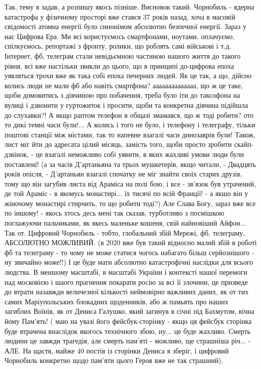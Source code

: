 Так, тему я задав, а розпишу якось пізніше. Висновок такий.  Чорнобиль - ядерна
катастрофа у фізичному просторі вже стався 37 років назад, хоча в масовій
свідомості атомна енергії було синонімом абсолютно безпечної енергії. Зараз у
нас Цифрова Ера. Ми всі користуємось смартфонами, ноутами, оплачуємо,
спілкуємось, репортажі з фронту, ролики, що роблять самі військові і т.д.
Інтернет, фб, телеграм стали невідьємною частиною нашого життя до такого рівня,
всі вже настільки звикли до цього, що в принципі до-цифрова епоха уявляться
трохи вже як така собі епоха печерних людей. Як це так, а що, дійсно колись
люди не мали фб або навіть смартфона? аааааааааааааа, що ж це таке, щоби
домовитись з дівчиною про побачення, треба було іти до таксофона на вулиці і
дзвонити у гуртожиток і просити, щоби та конкретна дівчина підійшла до
слухавки?!  А якщо раптом телефон в общазі змамався, що ж тоді робити?  ото то
дикі темні часи були!... А колись і того не було, і телефону і телеграфу,
тільки поштові станції між містами, так то напевне взагалі часи динозаврів
були! Також, лист міг йти до адресата цілий місяць, замість того, щоби просто
зробити скайп-дзвінок, - це взагалі неможливо собі уявити, в яких жахливі умови
люди були поставлені! (а за часів Д'артаньяна та трьох мушкетерів, якщо читали,
- Двадцять років опісля, - Д'артаньян взагалі спочатку не міг знайти своїх
старих друзів, тому що він загубив листа від Араміса на полі бою, і все -
зв'язок був утрачений, де той Араміс - в якомусь монастирі... їх тисячі по всій
Франції! - а якшо він у жіночому монастирі стирчить, то що робити тоді?)  Але
Слава Богу, зараз вже все по іншому! - якось хтось десь мені так сказав,
турботливо з посмішкою поглажуючи пальчиками, як якесь маленьке кошеня, свій
найновіший Айфон... Так от. Цифровий Чорнобиль - тобто, глобальний збій Мережі,
фб, телеграму, АБСОЛЮТНО МОЖЛИВИЙ. (в 2020 вже був такий відносно малий збій в
роботі фб та телеграму  - то чому не може статися чогось набагато більш
серйознішого - ну звичайно може!!) І це буде мати абсолютно катастрофічні
наслідки для всього людства. В меншому масштабі, в масштабі України і контексті
нашої перемоги над московією і шаого прагнення покарати росію за всі її
злочини, це призведе до втрати назавжди величезної кількості неймовірно
важливих даних, як от тих самих Маріупольських блокадних щоденників, або ж
памьять про наших загиблих Воїнів, як от Дениса Галушко, який загинув в січні
під Бахмутом, вічна йому Пам'ять!  ( маю на увазі його фейсбук-сторінку - якщо
ця фейсбук сторінка буде втрачена внаслідок якогось технічного збою, ну... це
буде жахливо. Смерть людини це завжди трагедія, але смерть пам'яті - можливо,
ще страшніша річ... - АЛЕ. На щастя, майже 40 постів із сторінки Дениса я
зберіг, і цифровий Чорнобиль конкретно щодо пам'яти цього Героя вже не так
страшний).

